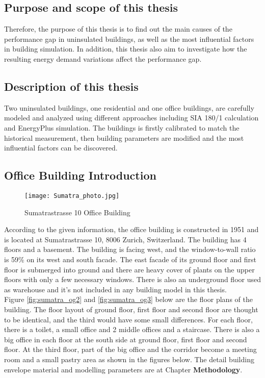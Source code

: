 \documentclass[11pt, a4paper]{article}
\theoremstyle{definition}
\begin{document}
	\subsection{Purpose and scope of this thesis}
		Therefore, the purpose of this thesis is to find out the main causes of the performance gap in uninsulated buildings, as well as the most influential factors in building simulation. In addition, this thesis also aim to investigate how the resulting energy demand variations affect the performance gap.

	\subsection{Description of this thesis}
		Two uninsulated buildings, one residential and one office buildings, are carefully modeled and analyzed using different approaches including SIA 180/1 calculation and EnergyPlus simulation. The buildings is firstly calibrated to match the historical measurement, then building parameters are modified and the most influential factors can be discovered.


	\subsection{Office Building Introduction}
		
		\begin{figure}[h!]
		\centering
		\texttt{[image: Sumatra\_photo.jpg]}
		\caption{Sumatrastrasse 10 Office Building}
		\label{fig:Sumatra_photo}
		\end{figure}
		 
		
		According to the given information, the office building is constructed in 1951 and is located at Sumatrastrasse 10, 8006 Zurich, Switzerland. The building has 4 floors and a basement. The building  is facing west, and the window-to-wall ratio is 59\% on its west and south facade. The east facade of its ground floor and first floor is submerged into ground and there are heavy cover of plants on the upper floors with only a few necessary windows. There is also an underground floor used as warehouse and it's not included in any building model in this thesis.\\

		Figure \ref{fig:sumatra_og2} and \ref{fig:sumatra_og3} below are the floor plans of the building.
		The floor layout of ground floor, first floor and second floor are thought to be identical, and the third would have some small differences. For each floor, there is a toilet, a small office and 2 middle offices and a staircase. There is also a big office in each floor at the south side at ground floor, first floor and second floor. At the third floor, part of the big office and the corridor become a meeting room and a small pastry area as shown in the figures below. The detail building envelope material and modelling parameters are at Chapter \textbf{Methodology}.
		
\end{document}
